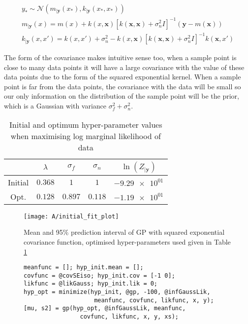 \documentclass[11pt]{article}
\begin{document}
\begin{equation*}
    \begin{gathered}
        y_* \sim \mathcal{N}(m_{|\textbf{y}}(x_*), k_{|\textbf{y}}(x_*, x_*)) \\
        m_{|\textbf{y}}(x) = m(x) + k(x, \textbf{x})[k(\textbf{x}, \textbf{x}) + \sigma_n^2 I]^{-1} (\textbf{y} - m(\textbf{x})) \\
        k_{|\textbf{y}}(x, x') = k(x, x') + \sigma_n^2 - k(x, \textbf{x})[k(\textbf{x}, \textbf{x}) + \sigma_n^2 I]^{-1} k(\textbf{x}, x')
    \end{gathered}
    \label{equation:A_predictive_distribution}
\end{equation*}

The form of the covariance makes intuitive sense too, when a sample point is close to many data points it will have a large covariance with the value of these data points due to the form of the squared exponential kernel. When a sample point is far from the data points, the covariance with the data will be small so our only information on the distribution of the sample point will be the prior, which is a Gaussian with variance $\sigma_f^2 + \sigma_n^2$.

\begin{table}[h]
    \centering
    \small
    \begin{tabular}{|c|c|c|c|c|}
        \hline
         & $\lambda$ & $\sigma_f$ & $\sigma_n$ & $\ln(Z_{|\textbf{y}})$ \\
        \hline
        Initial & $0.368$ & $1$ & $1$ & $\num{-9.29e+01}$ \\ 
        Opt. & $0.128$ & $0.897$ & $0.118$ & $\num{-1.19e+01}$ \\ 
        \hline
    \end{tabular}
    \caption{Initial and optimum hyper-parameter values when maximising log marginal likelihood of data}
    \label{table:A_hyper_parameters}
\end{table}

\begin{figure}[h]
    \centering
    \texttt{[image: A/initial\_fit\_plot]}
    \caption{Mean and 95\% prediction interval of GP with squared exponential covariance function, optimised hyper-parameters used given in Table \ref{table:A_hyper_parameters}}
    \label{fig:A}
\end{figure}

\begin{figure}[h]
\begin{lstlisting}[caption=Code to train hyper-parameters and generate the predictive distribution of a GP with squared exponential covariance, captionpos=b, basicstyle=\small, frame=tlrb]
meanfunc = []; hyp_init.mean = [];
covfunc = @covSEiso; hyp_init.cov = [-1 0];
likfunc = @likGauss; hyp_init.lik = 0;
hyp_opt = minimize(hyp_init, @gp, -100, @infGaussLik, 
                    meanfunc, covfunc, likfunc, x, y);
[mu, s2] = gp(hyp_opt, @infGaussLik, meanfunc, 
                covfunc, likfunc, x, y, xs);
\end{lstlisting}
\end{figure}
\label{lst:A}
\end{document}
